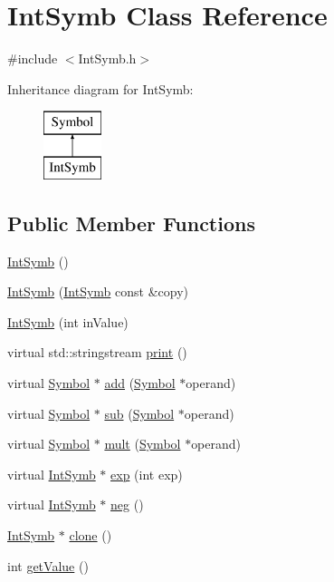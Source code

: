 \hypertarget{class_int_symb}{\section{Int\+Symb Class Reference}
\label{class_int_symb}
}


{\ttfamily \#include $<$Int\+Symb.\+h$>$}

Inheritance diagram for Int\+Symb\+:\begin{figure}[H]
\begin{center}
\leavevmode
\includegraphics[height=2.000000cm]{class_int_symb}
\end{center}
\end{figure}
\subsection*{Public Member Functions}
\begin{DoxyCompactItemize}
\item 
\hyperlink{class_int_symb_ab3990513e9be8549645e5b6cef5bb8ef}{Int\+Symb} ()
\item 
\hyperlink{class_int_symb_acf0f67c2d4cdd579e1b35d558620faaa}{Int\+Symb} (\hyperlink{class_int_symb}{Int\+Symb} const \&copy)
\item 
\hyperlink{class_int_symb_a45cd842eea27be9fc89adc788c9a6985}{Int\+Symb} (int in\+Value)
\item 
virtual std\+::stringstream \hyperlink{class_int_symb_a22115e6d6a513977d4cdad1013cdd15d}{print} ()
\item 
virtual \hyperlink{class_symbol}{Symbol} $\ast$ \hyperlink{class_int_symb_a10885d3759e4a6765e8d564da4b53b2e}{add} (\hyperlink{class_symbol}{Symbol} $\ast$operand)
\item 
virtual \hyperlink{class_symbol}{Symbol} $\ast$ \hyperlink{class_int_symb_ad4dd7298bf4a8ea002e86671a96f77d9}{sub} (\hyperlink{class_symbol}{Symbol} $\ast$operand)
\item 
virtual \hyperlink{class_symbol}{Symbol} $\ast$ \hyperlink{class_int_symb_ad0b2bd020dfd9c924cac7f722e8aac7e}{mult} (\hyperlink{class_symbol}{Symbol} $\ast$operand)
\item 
virtual \hyperlink{class_int_symb}{Int\+Symb} $\ast$ \hyperlink{class_int_symb_a39254e07e5adc1b4179a39dd8aed49f7}{exp} (int exp)
\item 
virtual \hyperlink{class_int_symb}{Int\+Symb} $\ast$ \hyperlink{class_int_symb_a24d2b18787ec241f268f3e8c259e6e64}{neg} ()
\item 
\hyperlink{class_int_symb}{Int\+Symb} $\ast$ \hyperlink{class_int_symb_a9a57c73450f2a93ca5ff93b0ad8f8aa9}{clone} ()
\item 
int \hyperlink{class_int_symb_acbf0d31076f6adcc3fad9a9bc57c2b82}{get\+Value} ()
\end{DoxyCompactItemize}
